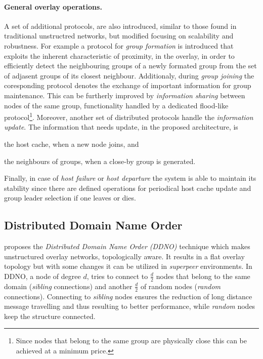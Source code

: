 \documentclass[a4paper,10pt]{article}
\begin{document}
\paragraph{General overlay operations.} A set of additional protocols, are also introduced, similar to those found in traditional unstructred networks, but modified focusing on scalability and robustness. For example a protocol for \emph{group formation} is introduced that exploits the inherent characteristic of proximity, in the overlay, in order to efficiently detect the neighbouring groups of a newly formated group from the set of adjasent groups of its closest neighbour. Additionaly, during \emph{group joining} the coresponding protocol denotes the exchange of important information for group maintenance. This can be furtherly improved by \emph{information sharing} between nodes of the same group, functionality handled by a dedicated flood-like protocol\footnote{Since nodes that belong to the same group are physically close this can be achieved at a minimum price.}. Moreover, another set of distributed protocols handle the \emph{information update}. The information that needs update, in the proposed architecture, is
\begin{inparaenum}
  \item the host cache, when a new node joins, and
  \item the neighbours of groups, when a close-by group is generated.
\end{inparaenum}
Finally, in case of \emph{host failure} or \emph{host departure} the system is able to maintain its stability since there are defined operations for periodical host cache update and group leader selection if one leaves or dies.

\subsection{Distributed Domain Name Order}
\cite{zeinalipour-yazti_ddno_2005} proposes the \emph{Distributed Domain Name Order (DDNO)} technique which makes unstructured overlay networks, topologically aware. It results in a flat overlay topology but with some changes it can be utilized in \emph{superpeer} environments. In DDNO, a node of degree $d$, tries to connect to $\frac{d}{2}$ nodes that belong to the same domain (\emph{sibling} connections) and another $\frac{d}{2}$ of random nodes (\emph{random} connections). Connecting to \emph{sibling} nodes ensures the reduction of long distance message travelling and thus resulting to better performance, while \emph{random} nodes keep the structure connected.
\end{document}
